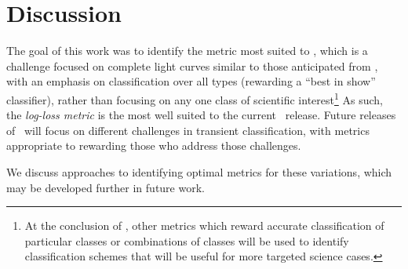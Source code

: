 \section{Discussion}
\label{sec:discussion}

The goal of this work was to identify the metric most suited to \plasticc, which is a challenge focused on 
complete light curves similar to those anticipated from \lsst, with an emphasis on classification over all types 
(rewarding a ``best in show'' classifier), 
rather than focusing on any one class of scientific interest\footnote{At the conclusion of \plasticc, other metrics 
which reward accurate classification of particular classes or combinations of classes will be used to identify 
classification schemes that will be useful for more targeted science cases.}
As such, the \textit{log-loss metric} is the most well suited to the current \plasticc\ release. 
Future releases of \plasticc\ will focus on different challenges in transient classification, 
with metrics appropriate to rewarding those who address those challenges.


We discuss approaches to identifying optimal metrics for these variations, which may be developed further in future work.


